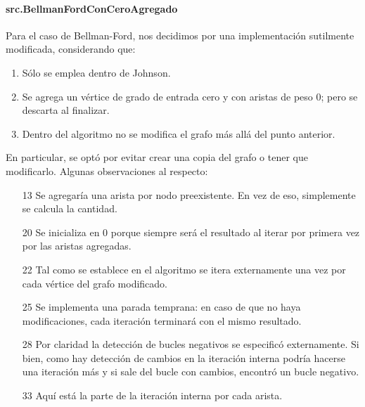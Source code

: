 \documentclass[../tp2_grupo404.tex]{subfiles}
\begin{document}
\paragraph{src.BellmanFordConCeroAgregado}

Para el caso de Bellman-Ford, nos decidimos por una implementación sutilmente modificada, considerando que:
\begin{enumerate}
    \item Sólo se emplea dentro de Johnson.
    \item Se agrega un vértice de grado de entrada cero y con aristas de peso 0; pero se descarta al finalizar.
    \item Dentro del algoritmo no se modifica el grafo más allá del punto anterior.
\end{enumerate}

En particular, se optó por evitar crear una copia del grafo o tener que modificarlo. Algunas observaciones al respecto:
\begin{enumerate}
    \item[13] Se agregaría una arista por nodo preexistente. En vez de eso, simplemente se calcula la cantidad.
    \item[20] Se inicializa en 0 porque siempre será el resultado al iterar por primera vez por las aristas agregadas.
    \item[22] Tal como se establece en el algoritmo se itera externamente una vez por cada vértice del grafo modificado.
    \item[25] Se implementa una parada temprana: en caso de que no haya modificaciones, cada iteración terminará con el mismo resultado.
    \item[28] Por claridad la detección de bucles negativos se especificó externamente.
    Si bien, como hay detección de cambios en la iteración interna podría hacerse una iteración más y si sale del bucle
    con cambios, encontró un bucle negativo.
    \item[33] Aquí está la parte de la iteración interna por cada arista.
\end{enumerate}
\end{document}
